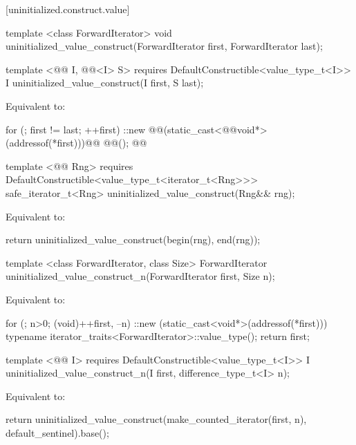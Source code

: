 [uninitialized.construct.value]{}
{\color{remclr}
\begin{codeblock}
template <class ForwardIterator>
  void uninitialized_value_construct(ForwardIterator first, ForwardIterator last);
\end{codeblock}
} %
{\color{addclr}
\begin{codeblock}
template <@@ I, @@<I> S>
  requires
DefaultConstructible<value_type_t<I>>
  I uninitialized_value_construct(I first, S last);
\end{codeblock}
} %

\setcounter{Paras}{0}
\pnum
\effects Equivalent to:

\begin{codeblock}
    for (; first != last; ++first)
      ::new @@(static_cast<@@void*>(addressof(*first)))@\added{)}@
        @@();
    @@
\end{codeblock}

{\color{addclr}
\begin{codeblock}
template <@@ Rng>
requires
  DefaultConstructible<value_type_t<iterator_t<Rng>>>
safe_iterator_t<Rng> uninitialized_value_construct(Rng&& rng);
\end{codeblock}

\pnum
\effects Equivalent to:
\begin{codeblock}
    return uninitialized_value_construct(begin(rng), end(rng));
\end{codeblock}
} %

{\color{remclr}
\begin{codeblock}
template <class ForwardIterator, class Size>
  ForwardIterator uninitialized_value_construct_n(ForwardIterator first, Size n);
\end{codeblock}
\setcounter{Paras}{1}
\pnum
\effects Equivalent to:
\begin{codeblock}
        for (; n>0; (void)++first, --n)
          ::new (static_cast<void*>(addressof(*first)))
            typename iterator_traits<ForwardIterator>::value_type();
        return first;
\end{codeblock}
} %

{\color{addclr}
\begin{codeblock}
template <@@ I>
  requires
DefaultConstructible<value_type_t<I>>
  I uninitialized_value_construct_n(I first, difference_type_t<I> n);
\end{codeblock}

\pnum
\effects Equivalent to:
\begin{codeblock}
    return uninitialized_value_construct(make_counted_iterator(first, n),
                                         default_sentinel{}).base();
\end{codeblock}
} %

